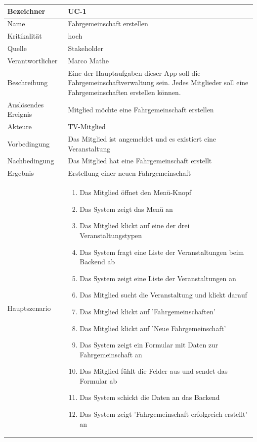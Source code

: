 \begin{table}[ht]
\centering
  \begin{tabular}{ l | p{10cm} }
	\hline
	\rowcolor{gray}
	Bezeichner		&	UC-1\\ \hline
	Name			&	Fahrgemeinschaft erstellen\\ \hline
	Kritikalität		&	hoch\\ \hline
	Quelle			&	Stakeholder\\ \hline
	Verantwortlicher	&	Marco Mathe\\ \hline
	Beschreibung	&	Eine der Hauptaufgaben dieser App soll die Fahrgemeinschaftverwaltung sein. Jedes Mitglieder soll eine Fahrgemeinschaften erstellen können.\\ \hline
	Auslösendes Ereignis&	Mitglied möchte eine Fahrgemeinschaft erstellen\\ \hline
	Akteure		&	TV-Mitglied\\ \hline
	Vorbedingung	&	Das Mitglied ist angemeldet und es existiert eine Veranstaltung\\ \hline
	Nachbedingung	&	Das Mitglied hat eine Fahrgemeinschaft erstellt\\ \hline
	Ergebnis		&	Erstellung einer neuen Fahrgemeinschaft\\ \hline
	Hauptszenario	&	\begin{enumerate}
					\item Das Mitglied öffnet den Menü-Knopf
					\item Das System zeigt das Menü an
					\item Das Mitglied klickt auf eine der drei Veranstaltungstypen
					\item Das System fragt eine Liste der Veranstaltungen beim Backend ab
					\item Das System zeigt eine Liste der Veranstaltungen an
					\item Das Mitglied sucht die Veranstaltung und klickt darauf
					\item Das Mitglied klickt auf 'Fahrgemeinschaften'
					\item Das Mitglied klickt auf 'Neue Fahrgemeinschaft'
					\item Das System zeigt ein Formular mit Daten zur Fahrgemeinschaft an
					\item Das Mitglied fühlt die Felder aus und sendet das Formular ab
					\item Das System schickt die Daten an das Backend
					\item Das System zeigt 'Fahrgemeinschaft erfolgreich erstellt' an
					\end{enumerate}

\end{tabular}
\end{table}
